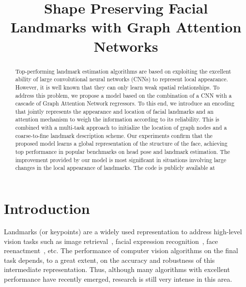 \documentclass{bmvc2k}
\title{Shape Preserving Facial Landmarks with Graph Attention Networks}
\begin{document}
\maketitle

\begin{abstract}
Top-performing landmark estimation algorithms are based on exploiting the excellent ability of large convolutional neural networks (CNNs) to represent local appearance. However, it is well known that they can only learn weak spatial relationships. To address this problem, we propose a model based on the combination of a CNN with a cascade of Graph Attention Network regressors. To this end, we introduce an encoding that jointly represents the appearance and location of facial landmarks and an attention mechanism to weigh the information according to its reliability. This is combined with a multi-task approach to initialize the location of graph nodes and a coarse-to-fine landmark description scheme. Our experiments confirm that the proposed model learns a global representation of the structure of the face, achieving top performance in popular benchmarks on head pose and landmark estimation. The improvement provided by our model is most significant in situations involving large changes in the local appearance of landmarks. The code is publicly available at \href{https://github.com/andresprados/SPIGA}{\color{bmv@sectioncolor}{https://github.com/andresprados/SPIGA}}

\end{abstract}

\section{Introduction}
\label{sec:intro}

Landmarks (or keypoints) are a widely used representation to address high-level vision tasks such as image retrieval~\cite{MoskvyakWACV21}, facial expression recognition~\cite{Sun19}, face reenactment~\cite{Zhang20Freenet}, etc.
The performance of computer vision algorithms on the final task depends, to a great extent, on the accuracy and robustness of this intermediate representation. Thus, although many algorithms with excellent performance have recently emerged, research is still very intense in this area.
\end{document}
